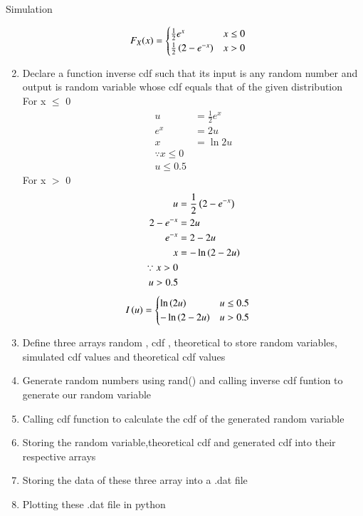\documentclass{beamer}
\begin{document}
\begin{frame}[allowframebreaks]{Simulation}
\begin{enumerate}
  \begin{align}
  F_X(x) &= 
  \begin{cases}
	  \frac{1}{2} e^{x} & x \le 0
  \\
	  \frac{1}{2} \left(2-e^{-x}\right) &  x > 0
  \end{cases}
  \end{align}
\item Declare a function inverse cdf  such that its input is any random number 
	and output is random variable whose cdf equals that of the given distribution\\
	For x $\le$ 0
		\begin{align}
			u &= \frac{1}{2} e^{x}\\
			e^{x} &= 2u\\
			x &= \ln{2u}\\
			\because x \le 0\\
			u \le 0.5
		\end{align}
	For x $>$ 0
		\begin{align}
			u &= \frac{1}{2} \left(2-e^{-x}\right)\\
			2-e^{-x} &= 2u\\
			e^{-x} &= 2-2u\\
			x &= -\ln \left(2-2u\right)\\
			\because x > 0\\
			u > 0.5
		\end{align}
  \begin{align}
  I\left(u\right) &=
  \begin{cases}
	  \ln\left(2u\right) & u \le 0.5
  \\
	  -\ln \left(2-2u\right) &  u > 0.5
  \end{cases}
  \end{align}
\item Define three arrays random , cdf
	, theoretical
	to store random variables, simulated cdf values and theoretical cdf values
\item Generate random numbers using rand() and calling inverse cdf funtion to generate our random variable
\item Calling cdf function to calculate the cdf of the generated random variable
\item Storing the random variable,theoretical cdf and generated cdf into their respective arrays
\item Storing the data of these three array into a .dat file
\item Plotting these .dat file in python
\end{enumerate}
\end{frame}
\end{document}
